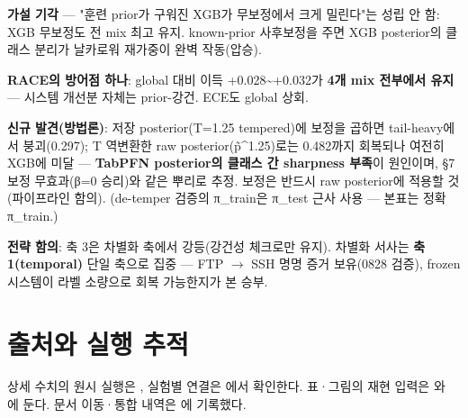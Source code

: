 \par\noindent \textbullet\enspace \textbf{가설 기각} — "훈련 prior가 구워진 XGB가 무보정에서 크게 밀린다"는 성립 안 함: XGB 무보정도 전 mix 최고 유지. known-prior 사후보정을 주면 XGB posterior의 클래스 분리가 날카로워 재가중이 완벽 작동(압승).


\par\noindent \textbullet\enspace \textbf{RACE의 방어점 하나}: global 대비 이득 +\allowbreak{}0.028\textasciitilde{}+\allowbreak{}0.032가 \textbf{4개 mix 전부에서 유지} — 시스템 개선분 자체는 prior-강건. ECE도 global 상회.


\par\noindent \textbullet\enspace \textbf{신규 발견(방법론)}: 저장 posterior(T=\allowbreak{}1.25 tempered)에 보정을 곱하면 tail-heavy에서 붕괴(0.297); T 역변환한 raw posterior(p̃\textasciicircum{}1.25)로는 0.482까지 회복되나 여전히 XGB에 미달 — \textbf{TabPFN posterior의 클래스 간 sharpness 부족}이 원인이며, §7 보정 무효과(β=\allowbreak{}0 승리)와 같은 뿌리로 추정. 보정은 반드시 raw posterior에 적용할 것(파이프라인 함의). (de-temper 검증의 π\_\allowbreak{}train은 π\_\allowbreak{}test 근사 사용 — 본표는 정확 π\_\allowbreak{}train.)


\par\noindent \textbullet\enspace \textbf{전략 함의}: 축 3은 차별화 축에서 강등(강건성 체크로만 유지). 차별화 서사는 \textbf{축 1(temporal)} 단일 축으로 집중 — FTP \ensuremath{\rightarrow} SSH 명명 증거 보유(0828 검증), frozen 시스템이 라벨 소량으로 회복 가능한지가 본 승부.




\section*{출처와 실행 추적}

상세 수치의 원시 실행은 , 실험별 연결은 에서 확인한다. 표·그림의 재현 입력은 와 에 둔다. 문서 이동·통합 내역은 에 기록했다.


